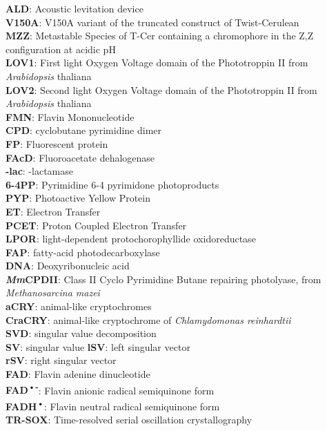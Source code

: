 \documentclass{report}
\begin{document}
\textbf{ALD}: Acoustic levitation device\\
\textbf{V150A}: V150A variant of the truncated construct of Twist-Cerulean\\
\textbf{MZZ}: Metastable Species of T-Cer containing a chromophore in the Z,Z configuration at acidic pH\\
\textbf{LOV1}: First light Oxygen Voltage domain of the Phototroppin II from \textit{Arabidopsis} thaliana\\
\textbf{LOV2}: Second light Oxygen Voltage domain of the Phototroppin II from \textit{Arabidopsis} thaliana\\
\textbf{FMN}: Flavin Mononucleotide\\
\textbf{CPD}: cyclobutane pyrimidine dimer\\
\textbf{FP}: Fluorescent protein\\
\textbf{FAcD}: Fluoroacetate dehalogenase\\
\textbf{\textBeta-lac}: \textBeta-lactamase\\
\textbf{6-4PP}: Pyrimidine 6-4 pyrimidone photoproducts\\
\textbf{PYP}: Photoactive Yellow Protein\\
\textbf{ET}: Electron Transfer\\
\textbf{PCET}: Proton Coupled Electron Transfer\\
\textbf{LPOR}: light-dependent protochorophyllide oxidoreductase\\
\textbf{FAP}: fatty-acid photodecarboxylase \\
\textbf{DNA}: Deoxyribonucleic acid\\
\textbf{\textit{Mm}CPDII}: Class II Cyclo Pyrimidine Butane repairing photolyase, from \textit{Methanosarcina mazei}\\
\textbf{aCRY}: animal-like cryptochromes\\
\textbf{CraCRY}: animal-like cryptochrome of \textit{Chlamydomonas reinhardtii}\\
\textbf{SVD}: singular value decomposition \\
\textbf{SV}: singular value
\textbf{lSV}: left singular vector\\
\textbf{rSV}: right singular vector \\
\textbf{FAD}: Flavin adenine dinucleotide\\
\textbf{FAD\textsuperscript{•-}}: Flavin anionic radical semiquinone form\\
\textbf{FADH\textsuperscript{•}}: Flavin neutral radical semiquinone form\\
\textbf{TR-SOX}: Time-resolved serial oscillation crystallography\\
\end{document}
